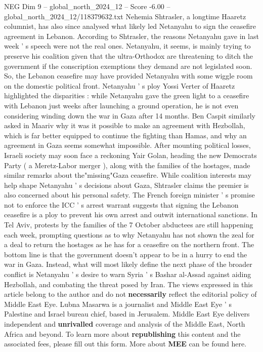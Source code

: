\begin{textsample}{NEG Dim 9 – global\_north\_2024\_12 – Score -6.00 – global\_north\_2024\_12/118379632.txt}
Nehemia Shtrasler, a longtime Haaretz columnist, has also since analysed what likely led Netanyahu to sign the ceasefire agreement in Lebanon.
According to Shtrasler, the reasons Netanyahu gave in last week ' s speech were not the real ones.
Netanyahu, it seems, is mainly trying to preserve his coalition given that the ultra-Orthodox are threatening to ditch the government if the conscription exemptions they demand are not legislated soon.
So, the Lebanon ceasefire may have provided Netanyahu with some wiggle room on the domestic political front.
Netanyahu ' s ploy Yossi Verter of Haaretz highlighted the disparities : while Netanyahu gave the green light to a ceasefire with Lebanon just weeks after launching a ground operation, he is not even considering winding down the war in Gaza after 14 months.
Ben Caspit similarly asked in Maariv why it was it possible to make an agreement with Hezbollah, which is far better equipped to continue the fighting than Hamas, and why an agreement in Gaza seems somewhat impossible.
After mounting political losses, Israeli society may soon face a reckoning Yair Golan, heading the new Democrats Party ( a Meretz-Labor merger ), along with the families of the hostages, made similar remarks about the"missing"Gaza ceasefire.
While coalition interests may help shape Netanyahu ' s decisions about Gaza, Shtrasler claims the premier is also concerned about his personal safety.
The French foreign minister ' s promise not to enforce the ICC ' s arrest warrant suggests that signing the Lebanon ceasefire is a ploy to prevent his own arrest and outwit international sanctions.
In Tel Aviv, protests by the families of the 7 October abductees are still happening each week, prompting questions as to why Netanyahu has not shown the zeal for a deal to return the hostages as he has for a ceasefire on the northern front.
The bottom line is that the government doesn't appear to be in a hurry to end the war in Gaza.
Instead, what will most likely define the next phase of the broader conflict is Netanyahu ' s desire to warn Syria ' s Bashar al-Assad against aiding Hezbollah, and combating the threat posed by Iran.
The views expressed in this article belong to the author and do not \textbf{necessarily} reflect the editorial policy of Middle East Eye.
Lubna Masarwa is a journalist and Middle East Eye ' s Palestine and Israel bureau chief, based in Jerusalem.
Middle East Eye delivers independent and \textbf{unrivalled} coverage and analysis of the Middle East, North Africa and beyond.
To learn more about \textbf{republishing} this content and the associated fees, please fill out this form.
More about \textbf{MEE} can be found here.

\end{textsample}
